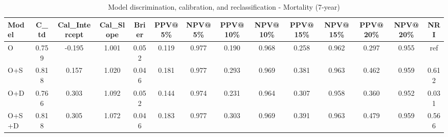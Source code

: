 \begin{table}[htbp]
\centering
\small
\caption{Model discrimination, calibration, and reclassification - Mortality (7-year)}
\label{tab:perf_mortality_7y}
\begin{tabular}{lccccccccccccc}
\toprule
Model & C\_td & Cal\_Intercept & Cal\_Slope & Brier & PPV@5\% & NPV@5\% & PPV@10\% & NPV@10\% & PPV@15\% & NPV@15\% & PPV@20\% & NPV@20\% & NRI \\
\midrule
O & 0.759 & -0.195 & 1.001 & 0.052 & 0.119 & 0.977 & 0.190 & 0.968 & 0.258 & 0.962 & 0.297 & 0.955 & ref \\
O+S & 0.818 & 0.157 & 1.020 & 0.046 & 0.181 & 0.977 & 0.293 & 0.969 & 0.381 & 0.963 & 0.462 & 0.959 & 0.612 \\
O+D & 0.766 & 0.303 & 1.092 & 0.052 & 0.144 & 0.974 & 0.231 & 0.964 & 0.307 & 0.958 & 0.360 & 0.952 & 0.031 \\
O+S+D & 0.818 & 0.305 & 1.072 & 0.046 & 0.183 & 0.977 & 0.303 & 0.969 & 0.391 & 0.963 & 0.479 & 0.959 & 0.566 \\
\bottomrule
\end{tabular}
\end{table}